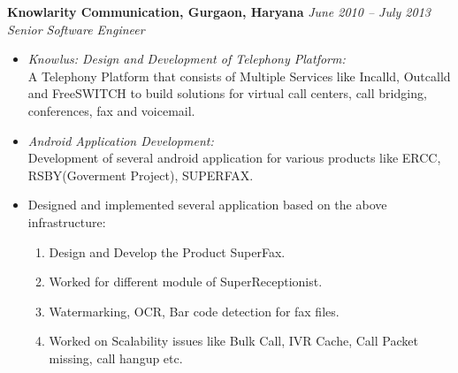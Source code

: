 \documentclass[margin,line]{resume}
\begin{document}
\begin{resume}
    \textbf{Knowlarity Communication, Gurgaon, Haryana}   \hfill \textsl{June 2010 -- July 2013} \vspace{0mm}\\\vspace{0mm}%
           \textsl{Senior Software Engineer} 
    \begin{itemize}
     \item \textsl{Knowlus: Design and Development of Telephony Platform:} \\
       A Telephony Platform that consists of Multiple Services like Incalld, Outcalld and FreeSWITCH to build solutions for virtual call centers, call bridging, conferences, fax and voicemail.
      
     \item \textsl{Android Application Development:} \\
      Development of several android application for various products like ERCC, RSBY(Goverment Project), SUPERFAX.
     \item Designed and implemented several application based on the above infrastructure:
        \begin{enumerate}
         \item Design and Develop the Product SuperFax.
         \item Worked for different module of SuperReceptionist.
	     \item Watermarking, OCR, Bar code detection for fax files.
	     \item Worked on Scalability issues like Bulk Call, IVR Cache, Call Packet missing, call hangup etc.
        \end{enumerate}
    \end{itemize}


\end{resume}
\end{document}
